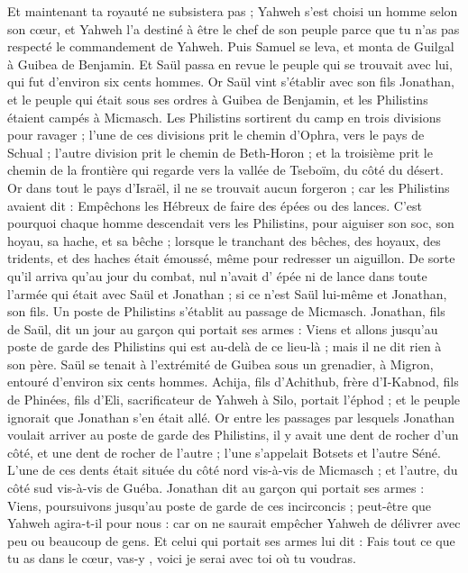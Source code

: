 \begin{multicols}{2}
Et maintenant ta royauté ne subsistera pas ; Yahweh s'est choisi un homme selon son cœur, et Yahweh l’a destiné à être le chef de son peuple parce que tu n'as pas respecté le commandement de Yahweh.
Puis Samuel se leva, et monta de Guilgal à Guibea de Benjamin. Et Saül passa en revue le peuple qui se trouvait avec lui, qui fut d'environ six cents hommes.
Or Saül vint s’établir avec son fils Jonathan, et le peuple qui était sous ses ordres à Guibea de Benjamin, et les Philistins étaient campés à Micmasch.
Les Philistins sortirent du camp en trois divisions pour ravager ; l'une de ces divisions prit le chemin d’Ophra, vers le pays de Schual ;
l'autre division prit le chemin de Beth-Horon ; et la troisième prit le chemin de la frontière qui regarde vers la vallée de Tseboïm, du côté du désert.
Or dans tout le pays d'Israël, il ne se trouvait aucun forgeron ; car les Philistins avaient dit : Empêchons les Hébreux de faire des épées ou des lances.
C'est pourquoi chaque homme descendait vers les Philistins, pour aiguiser son soc, son hoyau, sa hache, et sa bêche ;
lorsque le tranchant des bêches, des hoyaux, des tridents, et des haches était émoussé, même pour redresser un aiguillon.
De sorte qu’il arriva qu’au jour du combat, nul n’avait d’ épée ni de lance dans toute l’armée qui était avec Saül et Jonathan ; si ce n’est Saül lui-même et Jonathan, son fils.
Un poste de Philistins s’établit au passage de Micmasch.
\VerseOne{}Jonathan, fils de Saül, dit un jour au garçon qui portait ses armes : Viens et allons jusqu’au poste de garde des Philistins qui est au-delà de ce lieu-là ; mais il ne dit rien à son père.
Saül se tenait à l'extrémité de Guibea sous un grenadier, à Migron, entouré d'environ six cents hommes.
Achija, fils d'Achithub, frère d'I-Kabnod, fils de Phinées, fils d'Eli, sacrificateur de Yahweh à Silo, portait l'éphod ; et le peuple ignorait que Jonathan s'en était allé.
Or entre les passages par lesquels Jonathan voulait arriver au poste de garde des Philistins, il y avait une dent de rocher d’un côté, et une dent de rocher de l’autre ; l'une s’appelait Botsets et l'autre Séné.
L'une de ces dents était située du côté nord vis-à-vis de Micmasch ; et l'autre, du côté sud vis-à-vis de Guéba.
Jonathan dit au garçon qui portait ses armes : Viens, poursuivons jusqu’au poste de garde de ces incirconcis ; peut-être que Yahweh agira-t-il pour nous : car on ne saurait empêcher Yahweh de délivrer avec peu ou beaucoup de gens.
Et celui qui portait ses armes lui dit : Fais tout ce que tu as dans le cœur, vas-y , voici je serai avec toi où tu voudras.

\end{multicols}
